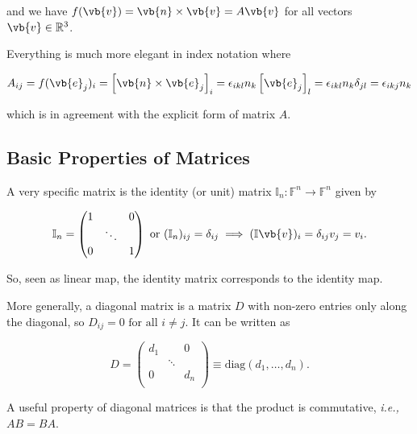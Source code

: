\documentclass[a4paper,12pt]{report}
\begin{document}
{and we have \(f(\vb{v} ) = \vb{n} \times \vb{v} = A\vb{v} \) for all vectors \(\vb{v} \in \mathbb{R}^3 \). 

Everything is much more elegant in index notation where

\begin{equation}
    A_{ij} = f(\vb{e} _{j} )_{i} = \left[ \vb{n} \times \vb{e} _{j}  \right] _{i} = \epsilon _{ikl}n_{k}\left[ \vb{e} _{j}  \right]_{l} = \epsilon _{ikl}n_{k}\delta _{jl}= \epsilon _{ikj}n_{k}       
\end{equation}

which is in agreement with the explicit form of matrix \(A\).} 



\subsection{Basic Properties of Matrices}

A very specific matrix is the identity (or unit) matrix \(\mathbb{I}_{n}: \mathbb{F}^{n} \rightarrow  \mathbb{F}^{n} \) given by 

\begin{equation}
    \mathbb{I}_{n} = \begin{pmatrix}
        1 &  &  0 \\
         & \ddots  &   \\
        0 &  & 1  \\
    \end{pmatrix} \text { or } (\mathbb{I}_{n} )_{ij} = \delta _{ij} \implies (\mathbb{I}\vb{v} )_{i} = \delta _{ij}v_{j} = v_{i}.
\end{equation}

So, seen as linear map, the identity matrix corresponds to the identity map.

More generally, a diagonal matrix is a matrix \(D\) with non-zero entries only along the diagonal, so \(D_{ij} = 0 \text{ for all } i \neq j \). It can be written as 

\begin{equation}
    D = \begin{pmatrix}
        d_{1}   &  & 0  \\
         & \ddots  &   \\
        0 &  & d_{n}  \\
    \end{pmatrix} \equiv \text{diag}(d_{1} ,\ldots ,d_{n} ). 
\end{equation}

A useful property of diagonal matrices is that the product is commutative, \textit{i.e.,} \(AB = BA\). 
\end{document}
